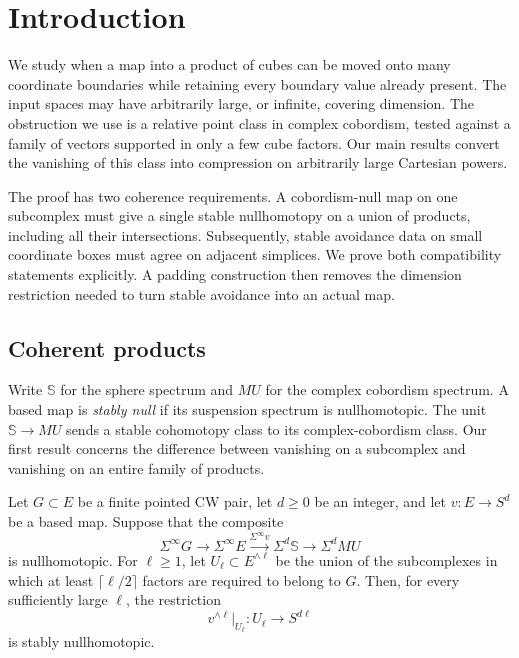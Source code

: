 \section{Introduction}
\label{sec:introduction}

We study when a map into a product of cubes can be moved onto many
coordinate boundaries while retaining every boundary value already
present.  The input spaces may have arbitrarily large, or infinite,
covering dimension.  The obstruction we use is a relative point class
in complex cobordism, tested against a family of vectors supported in
only a few cube factors.  Our main results convert the vanishing of
this class into compression on arbitrarily large Cartesian powers.

The proof has two coherence requirements.  A cobordism-null map on
one subcomplex must give a single stable nullhomotopy on a union of
products, including all their intersections.  Subsequently, stable
avoidance data on small coordinate boxes must agree on adjacent
simplices.  We prove both compatibility statements explicitly.  A
padding construction then removes the dimension restriction needed
to turn stable avoidance into an actual map.

\subsection{Coherent products}

Write $\mathbb S$ for the sphere spectrum and $MU$ for the complex
cobordism spectrum.  A based map is \emph{stably null} if its suspension
spectrum is nullhomotopic.  The unit $\mathbb S\to MU$ sends a stable
cohomotopy class to its complex-cobordism class.  Our first result
concerns the difference between vanishing on a subcomplex and
vanishing on an entire family of products.

\begin{theorem}
\label{thm:filtered-product}
Let $G\subset E$ be a finite pointed CW pair, let $d\geq0$ be an integer,
and let $v:E\to S^d$ be a based map.  Suppose that the composite
\[
\Sigma^\infty G\longrightarrow\Sigma^\infty E
 \xrightarrow{\Sigma^\infty v}\Sigma^d\mathbb S
 \longrightarrow\Sigma^d MU
\]
is nullhomotopic.  For $\ell\geq1$, let $U_\ell\subset E^{\wedge\ell}$
be the union of the subcomplexes in which at least
$\lceil\ell/2\rceil$ factors are required to belong to $G$.
Then, for every sufficiently large $\ell$, the restriction
\[
v^{\wedge\ell}|_{U_\ell}:U_\ell\longrightarrow S^{d\ell}
\]
is stably nullhomotopic.
\end{theorem}


